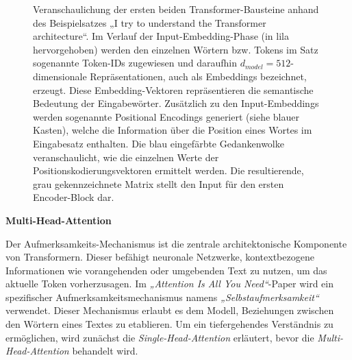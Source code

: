 \begin{figure}
	\centering
	
	\caption{Veranschaulichung der ersten beiden Transformer-Bausteine anhand des Beispielsatzes „I try to understand the Transformer architecture“. Im Verlauf der Input-Embedding-Phase (in lila hervorgehoben) werden den einzelnen Wörtern bzw. Tokens im Satz sogenannte Token-IDs zugewiesen und daraufhin $d_{model}=512$-dimensionale Repräsentationen, auch als Embeddings bezeichnet, erzeugt. Diese Embedding-Vektoren repräsentieren die semantische Bedeutung der Eingabewörter. Zusätzlich zu den Input-Embeddings werden sogenannte Positional Encodings generiert (siehe blauer Kasten), welche die Information über die Position eines Wortes im Eingabesatz enthalten. Die blau eingefärbte Gedankenwolke veranschaulicht, wie die einzelnen Werte der Positionskodierungsvektoren ermittelt werden. Die resultierende, grau gekennzeichnete Matrix stellt den Input für den ersten Encoder-Block dar.}
	\label{Abb:TransformerVisualization}
\end{figure}


\textbf{Multi-Head-Attention}

Der Aufmerksamkeits-Mechanismus ist die zentrale architektonische Komponente von Transformern. Dieser befähigt neuronale Netzwerke, kontextbezogene Informationen wie vorangehenden oder umgebenden Text zu nutzen, um das aktuelle Token vorherzusagen. \cite{Formal_Algorithms_for_Transformers_DeepMind} Im \emph{„Attention Is All You Need“}-Paper wird ein spezifischer Aufmerksamkeitsmechanismus namens \emph{„Selbstaufmerksamkeit“} verwendet. Dieser Mechanismus erlaubt es dem Modell, Beziehungen zwischen den Wörtern eines Textes zu etablieren. Um ein tiefergehendes Verständnis zu ermöglichen, wird zunächst die \emph{Single-Head-Attention} erläutert, bevor die \emph{Multi-Head-Attention} behandelt wird.

